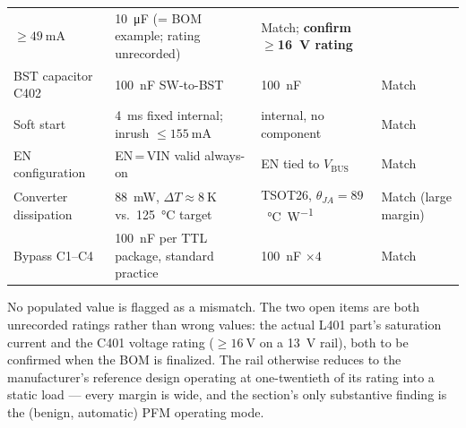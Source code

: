 \begin{longtable}{@{}p{}p{}p{}p{}@{}}
  $\geq\SI{49}{\milli\ampere}$ & \SI{10}{\micro\farad} (= BOM example; rating
  unrecorded) & Match; \textbf{confirm $\geq$16~V rating} \\
BST capacitor C402 & \SI{100}{\nano\farad} SW-to-BST & \SI{100}{\nano\farad} &
  Match \\
Soft start & \SI{4}{\milli\second} fixed internal; inrush
  $\leq\SI{155}{\milli\ampere}$ & internal, no component & Match \\
EN configuration & EN\,=\,VIN valid always-on & EN tied to $V_{\mathrm{BUS}}$ &
  Match \\
Converter dissipation & \SI{88}{\milli\watt}, $\Delta T \approx \SI{8}{\kelvin}$
  vs.\ \SI{125}{\celsius} target & TSOT26, $\theta_{JA}=89$~\si{\celsius\per\watt} &
  Match (large margin) \\
Bypass C1--C4 & \SI{100}{\nano\farad} per TTL package, standard practice &
  \SI{100}{\nano\farad} $\times 4$ & Match \\
\end{longtable}

No populated value is flagged as a mismatch. The two open items are both unrecorded
ratings rather than wrong values: the actual L401 part's saturation current and the C401
voltage rating ($\geq\SI{16}{\volt}$ on a 13~V rail), both to be confirmed when the BOM
is finalized. The rail otherwise reduces to the manufacturer's reference design operating
at one-twentieth of its rating into a static load --- every margin is wide, and the
section's only substantive finding is the (benign, automatic) PFM operating mode.
